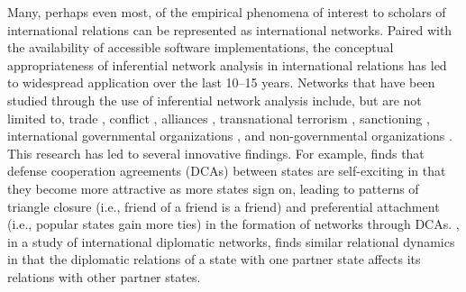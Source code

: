 \documentclass[fleqn,12pt]{wlscirep}
\begin{document}
Many, perhaps even most, of the empirical phenomena of interest to scholars of international relations can be represented as international networks. Paired with the availability of accessible software implementations, the conceptual appropriateness of inferential network analysis in international relations has led to widespread application over the last 10--15 years. Networks that have been studied through the use of inferential network analysis include, but are not limited to, trade \citep{ward2007persistent,fagiolo2014does,chu2010homogenization,chyzh2016dangerous}, conflict \citep{ward2007disputes,cranmer2011inferential,gallop2016endogenous,dorff2013networks}, alliances \citep{cranmer2012complex}, transnational terrorism \citep{desmarais2013forecasting,asal2016friends,metternich2013antigovernment,bush2015measuring}, sanctioning \citep{cranmer2014reciprocity,dorff2017states}, international governmental organizations \citep{davis2017forces,cao2012global,lupu2017networked}, and non-governmental organizations \citep{atouba2015international}. This research has led to several innovative findings. For example, \cite{kinne2018defense} finds that defense cooperation agreements (DCAs) between states are self-exciting in that they become more attractive as more states sign on, leading to patterns of triangle closure (i.e., friend of a friend is a friend) and preferential attachment (i.e., popular states gain more ties) in the formation of networks through DCAs. \cite{duque2018recognizing}, in a study of international diplomatic networks, finds similar relational dynamics in that the diplomatic relations of a state with one partner state affects its relations with other partner states.
\end{document}
